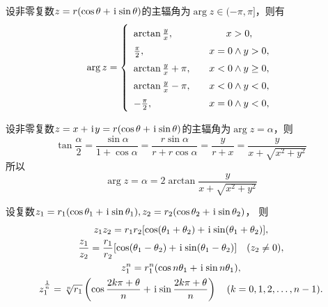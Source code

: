\begin{theorem}
设非零复数\(z=r(\cos\theta+ \kern1pt\mathrm{i}\kern1pt \sin\theta)\)的主辐角为\(\arg{z} \in (-\pi,\pi]\)，则有\begin{equation*}
\def\arraystretch{1.5}
\arg{z} = \left\{ \begin{array}{lc}
\arctan{\frac{y}{x}}, &\quad x > 0, \\
\frac{\pi}{2}, &\quad x = 0 \land y > 0, \\
\arctan{\frac{y}{x}} + \pi, &\quad x < 0 \land y \geq 0, \\
\arctan{\frac{y}{x}} - \pi, &\quad x < 0 \land y < 0, \\
-\frac{\pi}{2}, &\quad x = 0 \land y < 0,
\end{array} \right.
\end{equation*}
\end{theorem}

\begin{theorem}
设非零复数\(z = x + \kern1pt\mathrm{i}\kern1pt y=r(\cos\theta+ \kern1pt\mathrm{i}\kern1pt \sin\theta)\)的主辐角为\(\arg{z} = \alpha\)，则\begin{equation*}
\tan{\frac{\alpha}{2}}
= \frac{\sin\alpha}{1+\cos\alpha}
= \frac{r\sin\alpha}{r+r\cos\alpha}
= \frac{y}{r+x}
= \frac{y}{x+\sqrt{x^2+y^2}}
\end{equation*}所以\begin{equation*}
\arg{z} = \alpha
= 2 \arctan{ \frac{y}{x+\sqrt{x^2+y^2}} }
\end{equation*}
\end{theorem}

\begin{theorem}
设复数\(
	z_1 = r_1 (\cos\theta_1 + \kern1pt\mathrm{i}\kern1pt \sin\theta_1),
	z_2 = r_2 (\cos\theta_2 + \kern1pt\mathrm{i}\kern1pt \sin\theta_2)
\)，
则\begin{gather*}
	z_1 z_2
	= r_1 r_2 [\cos(\theta_1+\theta_2) + \kern1pt\mathrm{i}\kern1pt \sin(\theta_1+\theta_2)], \\
	\frac{z_1}{z_2}
	= \frac{r_1}{r_2} [\cos(\theta_1-\theta_2) + \kern1pt\mathrm{i}\kern1pt \sin(\theta_1-\theta_2)]
	\quad(z_2\neq0), \\
	z_1^n = r_1^n (\cos n\theta_1 + \kern1pt\mathrm{i}\kern1pt \sin n\theta_1), \\
	z_1^{\frac1n} = \sqrt[n]{r_1} \left( \cos\frac{2k\pi+\theta}{n} + \kern1pt\mathrm{i}\kern1pt \sin\frac{2k\pi+\theta}{n} \right)
	\quad(k=0,1,2,\dotsc,n-1).
\end{gather*}
\end{theorem}

